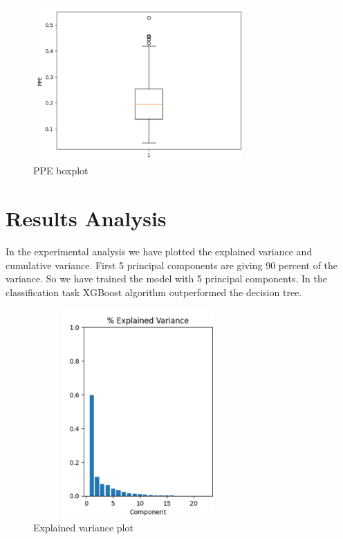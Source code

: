 \documentclass[conference]{IEEEtran}
\begin{document}
  
   \begin{figure}[!ht]
     \centering
     \includegraphics[height=6cm,width=8cm]{ppe.png}
    \caption{PPE boxplot}
    \label{fig:8}
 \end{figure}

 
\newpage
\section{Results Analysis}
In the experimental analysis  we have plotted the explained variance and cumulative variance.
First 5 principal components are giving 90 percent of the variance. So we have trained the model with 5 principal components. In the classification task XGBoost algorithm outperformed the decision tree.


\begin{figure}[!ht]
     \centering
     \includegraphics[height=8cm,width=8cm]{pca1.png}
     \caption{Explained variance plot}
     \label{fig:8}
 \end{figure}
\end{document}
